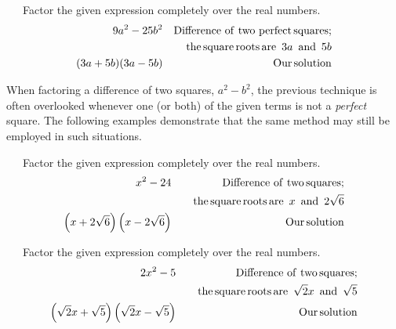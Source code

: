 \begin{example}~~~Factor the given expression completely over the real numbers.
  \begin{eqnarray*}
    9 a^2 - 25 b^2 &  & \operatorname{Difference~of~two~perfect} \operatorname{squares};\\
		& & ~~~\operatorname{the} \operatorname{square} \operatorname{roots} \operatorname{are~} 3a \operatorname{~and~} 5b\\
    (3 a + 5 b) (3 a - 5 b) &  & \operatorname{Our} \operatorname{solution}
  \end{eqnarray*}
\end{example}
When factoring a difference of two squares, $a^2-b^2$, the previous technique is often overlooked whenever one (or both) of the given terms is not a \textit{perfect} square.  The following examples demonstrate that the same method may still be employed in such situations.
\begin{example}~~~Factor the given expression completely over the real numbers.
  \begin{eqnarray*}
    x^2 - 24 &  & \operatorname{Difference~of~two} \operatorname{squares};\\
		& & ~~~\operatorname{the} \operatorname{square} \operatorname{roots} \operatorname{are~} x \operatorname{~and~} 2\sqrt{6}\\
    \left(x + 2\sqrt{6}\right) \left(x - 2\sqrt{6}\right) &  & \operatorname{Our} \operatorname{solution}
  \end{eqnarray*}
\end{example}
\begin{example}~~~Factor the given expression completely over the real numbers.
  \begin{eqnarray*}
    2x^2 - 5 &  & \operatorname{Difference~of~two} \operatorname{squares};\\
		& & ~~~\operatorname{the} \operatorname{square} \operatorname{roots} \operatorname{are~} \sqrt{2}x \operatorname{~and~} \sqrt{5}\\
    \left(\sqrt{2}x + \sqrt{5}\right) \left(\sqrt{2}x - \sqrt{5}\right) &  & \operatorname{Our} \operatorname{solution}
  \end{eqnarray*}
\end{example}

